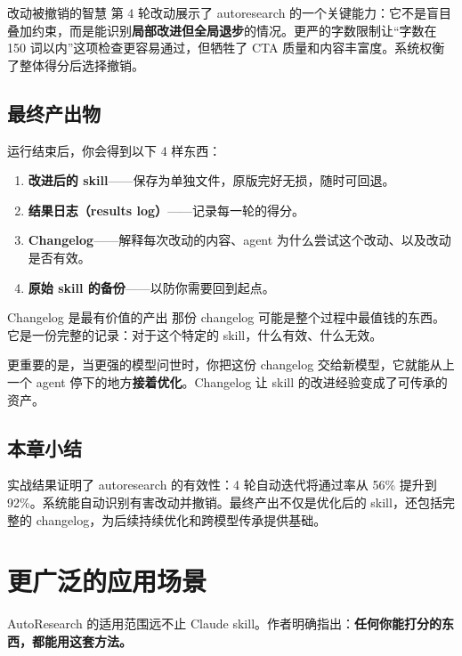 \documentclass[a4paper]{article}
\begin{document}
\begin{knowledgebox}{改动被撤销的智慧}
第 4 轮改动展示了 autoresearch 的一个关键能力：它不是盲目叠加约束，而是能识别\textbf{局部改进但全局退步}的情况。更严的字数限制让``字数在 150 词以内''这项检查更容易通过，但牺牲了 CTA 质量和内容丰富度。系统权衡了整体得分后选择撤销。
\end{knowledgebox}

\subsection{最终产出物}

运行结束后，你会得到以下 4 样东西：

\begin{enumerate}
    \item \textbf{改进后的 skill}——保存为单独文件，原版完好无损，随时可回退。
    \item \textbf{结果日志（results log）}——记录每一轮的得分。
    \item \textbf{Changelog}——解释每次改动的内容、agent 为什么尝试这个改动、以及改动是否有效。
    \item \textbf{原始 skill 的备份}——以防你需要回到起点。
\end{enumerate}

\begin{importantbox}{Changelog 是最有价值的产出}
那份 changelog 可能是整个过程中最值钱的东西。它是一份完整的记录：对于这个特定的 skill，什么有效、什么无效。

更重要的是，当更强的模型问世时，你把这份 changelog 交给新模型，它就能从上一个 agent 停下的地方\textbf{接着优化}。Changelog 让 skill 的改进经验变成了可传承的资产。
\end{importantbox}

\subsection{本章小结}

实战结果证明了 autoresearch 的有效性：4 轮自动迭代将通过率从 56\% 提升到 92\%。系统能自动识别有害改动并撤销。最终产出不仅是优化后的 skill，还包括完整的 changelog，为后续持续优化和跨模型传承提供基础。

\section{更广泛的应用场景}

AutoResearch 的适用范围远不止 Claude skill。作者明确指出：\textbf{任何你能打分的东西，都能用这套方法。}
\end{document}
